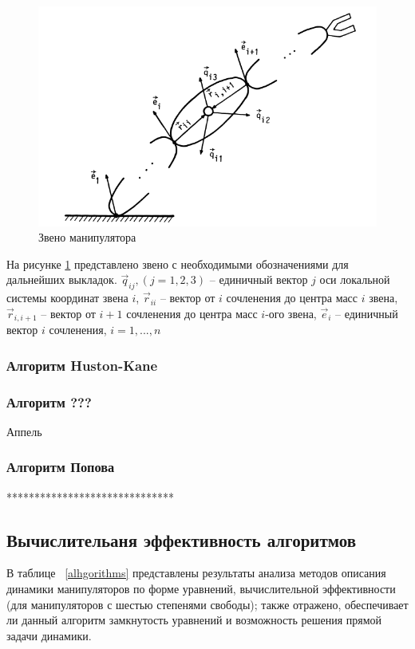 	\begin{figure}[H]
	\center\includegraphics[width=0.8\linewidth]{3.png}
	\caption{Звено манипулятора}
	\label{fig:scr3}
	\end{figure}

На рисунке \ref{fig:scr3} представлено звено с необходимыми обозначениями для дальнейших выкладок. $\vec q_{ij}, (j=1,2,3)$ -- единичный вектор $j$ оси локальной системы координат звена $i$, $\vec r_{ii}$ -- вектор от $i$ сочленения до центра масс $i$ звена, $\vec r_{i, i+1}$ -- вектор от $i+1$ сочленения до центра масс $i$-ого звена, $\vec e_i$ -- единичный вектор $i$ сочленения, $i = 1,..., n$ 




\subsubsection{Алгоритм Huston-Kane}

\subsubsection{Алгоритм ???}

Аппель
\subsubsection{Алгоритм Попова}



******************************
\subsection{Вычислительаня эффективность алгоритмов}

В таблице ~\ref{alhgorithms} представлены результаты анализа методов описания динамики манипуляторов по форме уравнений, вычислительной эффективности (для манипуляторов с шестью степенями свободы); также отражено, обеспечивает ли данный алгоритм замкнутость уравнений и возможность решения прямой задачи динамики.

